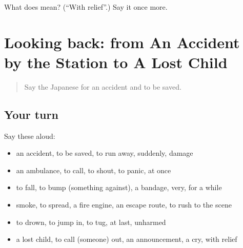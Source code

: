 \begin{tcolorbox}[breakable,colback=teal!4,colframe=teal!35!black,title={Before you move on}]
What does  mean? (\textquotedblleft{}With relief\textquotedblright{}.) Say it once more.
\end{tcolorbox}
\section[(dialogue)]{Looking back: from An Accident by the Station to A Lost Child}

\label{lesson:JA-R267-review-262-267}



\begin{quote}
Say the Japanese for an accident and to be saved.
\end{quote}

\subsection*{Your turn}
Say these aloud:

\begin{itemize}
\raggedright
  \item an accident, to be saved, to run away, suddenly, damage
  \item an ambulance, to call, to shout, to panic, at once
  \item to fall, to bump (something against), a bandage, very, for a while
  \item smoke, to spread, a fire engine, an escape route, to rush to the scene
  \item to drown, to jump in, to tug, at last, unharmed
  \item a lost child, to call (someone) out, an announcement, a cry, with relief
\end{itemize}

